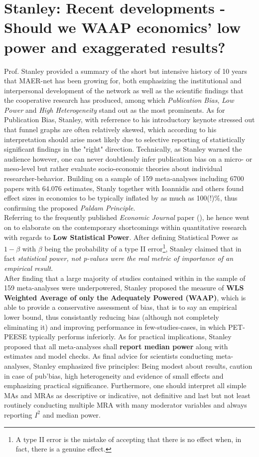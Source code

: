 \documentclass[a4paper,man,natbib]{apa6}
\begin{document}
\justifying
\section{Stanley: Recent developments - Should we WAAP economics’ low power and exaggerated results?}
\label{sec:WAAP}
Prof. Stanley provided a summary of the short but intensive history of 10 years that MAER-net has been growing for, both emphasizing the institutional and interpersonal development of the network as well as the scientific findings that the cooperative research has produced, among which \textit{Publication Bias}, \textit{Low Power} and \textit{High Heterogeneity} stand out as the most prominents. As for Publication Bias, Stanley, with referrence to his introductory keynote stressed out that funnel graphs are often relatively skewed, which according to his interpretation should arise most likely due to selective reporting of statistically significant findings in the "right" direction. Technically, as Stanley warned the audience however, one can never doubtlessly infer publication bias on a micro- or meso-level but rather evaluate socio-economic theories about individual researcher-behavior. Building on a sample of 159 meta-analyses including 6700 papers with 64.076 estimates, Stanly together with Ioannidis and others \cite{Ioannidis2016} found effect sizes in economics to be typically inflated by as much as 100(!)\%, thus confirming the proposed \textit{Paldam Principle}. \\
Referring to the frequently published \textit{Economic Journal} paper (\cite{Stanley2017}), he hence went on to elaborate on the contemporary shortcomings within quantitative research with regards to \textbf{Low Statistical Power}. After defining Statistical Power as $1-\beta$ with $\beta$ being the probability of a type II error\footnote[3]{A type II error is the mistake of accepting that there is no effect when, in fact, there is a genuine effect.}, Stanley claimed that in fact \textit{statistical power, not p-values were the real metric of importance of an empirical result}.\\
After finding that a large majority of studies contained within in the sample of 159 meta-analyses were underpowered, Stanley proposed the measure of \textbf{WLS Weighted Average of only the Adequately Powered (WAAP)}, which is able to provide a conservative assessment of bias, that is to say an empirical lower bound, thus consistantly reducing bias (although not completely eliminating it) and improving performance in few-studies-cases, in which PET-PEESE typically performs inferiorly. As for practical implications, Stanley proposed that all meta-analyses shall \textbf{report median power} along with estimates and model checks. As final advice for scientists conducting meta-analyses, Stanley emphasized five principles: Being modest about results, caution in case of pub’bias, high heterogeneity and evidence of small effects and emphasizing practical significance. Furthermore, one should interpret all simple MAs and MRAs as descriptive or indicative, not definitive and last but not least routinely conducting multiple MRA with many moderator variables and always reporting $I^2$ and median power. 
\end{document}
